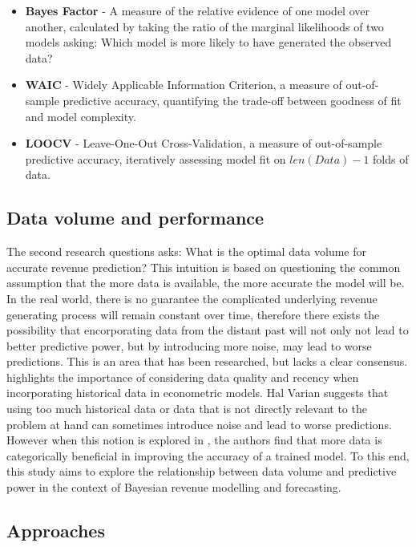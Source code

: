\begin{itemize}
  \item \textbf{Bayes Factor} - A measure of the relative evidence of one model
    over another, calculated by taking the ratio of the marginal likelihoods of
    two models asking: Which model is more likely to have generated the
    observed data?
  \item \textbf{WAIC} - Widely Applicable Information Criterion, a measure of
    out-of-sample predictive accuracy, quantifying the trade-off between
    goodness  of fit and model complexity.
  \item \textbf{LOOCV} - Leave-One-Out Cross-Validation, a measure of
    out-of-sample predictive accuracy, iteratively assessing model fit on
    $len(Data) - 1$ folds of data.
\end{itemize}

\subsection{Data volume and performance}
The second research questions asks: What is the optimal data volume for accurate
revenue prediction? This intuition is based on questioning the common
assumption that the more data is available, the more accurate the model will
be. In the real world, there is no guarantee the complicated underlying revenue
generating process will remain constant over time, therefore there exists the
possibility that encorporating data from the distant past will not only not
lead to better predictive power, but by introducing more noise, may lead to
worse predictions. This is an area that has been researched, but lacks a clear
consensus. 
\cite{big-data-hal-varian} highlights the importance of considering data
quality and recency when incorporating historical data in econometric models.
Hal Varian suggests that using too much historical data or data that is not
directly relevant to the problem at hand can sometimes introduce noise and lead
to worse predictions. However when this notion is explored in
\cite{data-volume-weather}, the authors find that more data is categorically
beneficial in improving the accuracy of a trained model. To this end, this
study aims to explore the relationship between data volume and predictive power
in the context of Bayesian revenue modelling and forecasting.

\subsection{Approaches}

